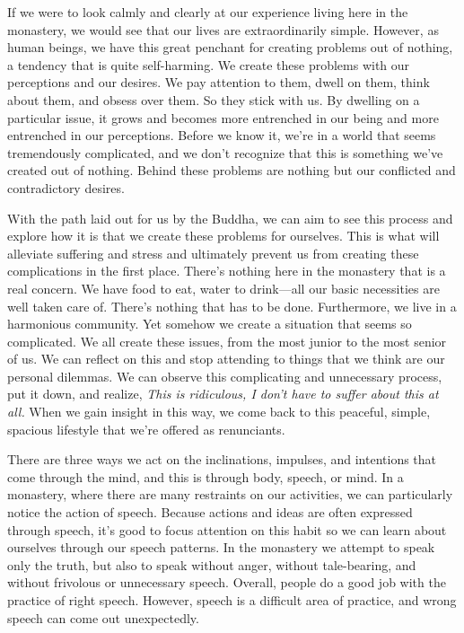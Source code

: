 If we were to look calmly and clearly at our experience living here in 
the monastery, we would see that our lives are extraordinarily simple. 
However, as human beings, we have this great penchant for creating 
problems out of nothing, a tendency that is quite self-harming. We 
create these problems with our perceptions and our desires. We pay 
attention to them, dwell on them, think about them, and obsess over 
them. So they stick with us. By dwelling on a particular issue, it 
grows and becomes more entrenched in our being and more entrenched in 
our perceptions. Before we know it, we're in a world that seems 
tremendously complicated, and we don't recognize that this is something 
we've created out of nothing. Behind these problems are nothing but our 
conflicted and contradictory desires.

With the path laid out for us by the Buddha, we can aim to see this 
process and explore how it is that we create these problems for 
ourselves. This is what will alleviate suffering and stress and 
ultimately prevent us from creating these complications in the first 
place. There's nothing here in the monastery that is a real concern. We 
have food to eat, water to drink---all our basic necessities are well 
taken care of. There's nothing that has to be done. Furthermore, we 
live in a harmonious community. Yet somehow we create a situation that 
seems so complicated. We all create these issues, from the most junior 
to the most senior of us. We can reflect on this and stop attending to 
things that we think are our personal dilemmas. We can observe this 
complicating and unnecessary process, put it down, and realize, 
\emph{This is ridiculous, I don't have to suffer about this at all.} 
When we gain insight in this way, we come back to this peaceful, 
simple, spacious lifestyle that we're offered as renunciants.


There are three ways we act on the inclinations, impulses, and 
intentions that come through the mind, and this is through body, 
speech, or mind. In a monastery, where there are many restraints on our 
activities, we can particularly notice the action of speech. Because 
actions and ideas are often expressed through speech, it's good to 
focus attention on this habit so we can learn about ourselves through 
our speech patterns. In the monastery we attempt to speak only the 
truth, but also to speak without anger, without tale-bearing, and 
without frivolous or unnecessary speech. Overall, people do a good job 
with the practice of right speech. However, speech is a difficult area 
of practice, and wrong speech can come out unexpectedly.

